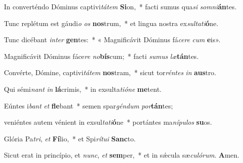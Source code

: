 \item In converténdo Dóminus captivi\textit{tá}\textit{tem} \textbf{Si}on,~* facti sumus qua\textit{si} \textit{som}\textit{ni}\textbf{án}tes.

\item Tunc replétum est gáudi\textit{o} \textit{os} \textbf{nos}trum,~* et lingua nostra ex\textit{sul}\textit{ta}\textit{ti}\textbf{ó}ne.

\item Tunc dicébant \textit{in}\textit{ter} \textbf{gen}tes:~* « Magnificávit Dóminus fá\textit{ce}\textit{re} \textit{cum} \textbf{e}is».

\item Magnificávit Dóminus fáce\textit{re} \textit{no}\textbf{bís}cum;~* facti \textit{su}\textit{mus} \textit{læ}\textbf{tán}tes.

\item Convérte, Dómine, captivi\textit{tá}\textit{tem} \textbf{nos}tram,~* sicut tor\textit{rén}\textit{tes} \textit{in} \textbf{aus}tro.

\item Qui sémi\textit{nant} \textit{in} \textbf{lá}crimis,~* in exsulta\textit{ti}\textit{ó}\textit{ne} \textbf{me}tent.

\item Eúntes i\textit{bant} \textit{et} \textbf{fle}bant~* semen spar\textit{gén}\textit{dum} \textit{por}\textbf{tán}tes;

\item veniéntes autem vénient in exsul\textit{ta}\textit{ti}\textbf{ó}ne~* portántes ma\textit{ní}\textit{pu}\textit{los} \textbf{su}os.

\item Glória Pa\textit{tri}, \textit{et} \textbf{Fí}lio,~* et Spi\textit{rí}\textit{tu}\textit{i} \textbf{Sanc}to.

\item Sicut erat in princípio, et \textit{nunc}, \textit{et} \textbf{sem}per,~* et in sǽcula sæ\textit{cu}\textit{ló}\textit{rum}. \textbf{A}men.